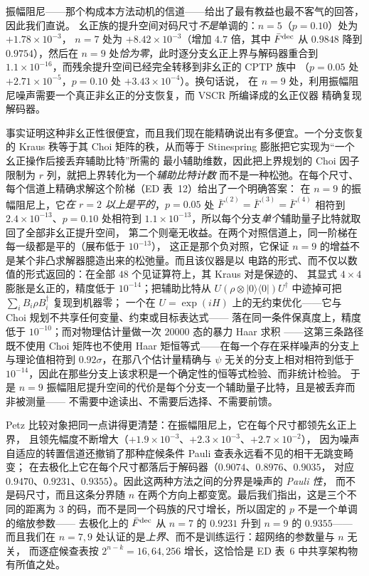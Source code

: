 \documentclass[11pt,a4paper]{article}
\newcommand{\ket}[1]{\lvert #1\rangle}
\newcommand{\bra}[1]{\langle #1\rvert}
\begin{document}
振幅阻尼——那个构成本方法动机的信道——给出了最有教益也最不客气的回答，因此我们直说。
幺正族的提升空间对码尺寸\emph{不是}单调的：$n=5$（$p=0.10$）处为 $+1.78\times10^{-3}$，
$n=7$ 处为 $+8.42\times10^{-3}$（增加 $4.7$ 倍，其中 $\bar F^{\rm dec}$ 从 $0.9848$ 降到
$0.9754$），然后在 $n=9$ 处\emph{恰为零}，此时逐分支幺正上界与解码器重合到
$1.1\times10^{-16}$，而残余提升空间已经完全转移到非幺正的 CPTP 族中
（$p=0.05$ 处 $+2.71\times10^{-5}$，$p=0.10$ 处 $+3.43\times10^{-4}$）。换句话说，
在 $n=9$ 处，利用振幅阻尼噪声需要一个真正非幺正的分支恢复，而 VSCR 所编译成的幺正仪器
精确复现解码器。

事实证明这种非幺正性很便宜，而且我们现在能精确说出有多便宜。一个分支恢复的 Kraus 秩等于其
Choi 矩阵的秩，从而等于 Stinespring 膨胀把它实现为“一个幺正操作后接丢弃辅助比特”所需的
最小辅助维数，因此把上界规划的 Choi 因子限制为 $r$ 列，就把上界转化为一个\emph{辅助比特计数}
而不是一种松弛。在每个尺寸、每个信道上精确求解这个阶梯（ED 表~12）给出了一个明确答案：
在 $n=9$ 的振幅阻尼上，它\emph{在 $r=2$ 以上是平的}，$p=0.05$ 处
$\bar F^{(2)}=\bar F^{(3)}=\bar F^{(4)}$ 相符到 $2.4\times10^{-13}$、$p=0.10$ 处相符到
$1.1\times10^{-13}$，所以每个分支\emph{单个}辅助量子比特就取回了全部非幺正提升空间，
第二个则毫无收益。在两个对照信道上，同一阶梯在每一级都是平的（展布低于 $10^{-13}$），
这正是那个负对照，它保证 $n=9$ 的增益不是某个非凸求解器臆造出来的松弛量。而且该仪器是以
电路的形式、而不仅以数值的形式返回的：在全部 $48$ 个见证算符上，其 Kraus 对是保迹的、
其显式 $4\times4$ 膨胀是幺正的，精度低于 $10^{-14}$；把辅助比特从
$U(\rho\otimes\ket0\bra0)U^\dagger$ 中迹掉可把 $\sum_i B_i\rho B_i^\dagger$ 复现到机器零；
一个在 $U=\exp(iH)$ 上的无约束优化——它与 Choi 规划不共享任何变量、约束或目标表达式——
落在同一条件保真度上，精度低于 $10^{-10}$；而对物理估计量做一次 $20000$ 态的暴力 Haar 求积
——这第三条路径既不使用 Choi 矩阵也不使用 Haar 矩恒等式——在每一个存在采样噪声的分支上
与理论值相符到 $0.92\sigma$，在那八个估计量精确与 $\psi$ 无关的分支上相对相符到低于
$10^{-14}$，因此在那些分支上该求积是一个确定性的恒等式检验、而非统计检验。
于是 $n=9$ 振幅阻尼提升空间的代价是每个分支一个辅助量子比特，且是被丢弃而非被测量——
不需要中途读出、不需要后选择、不需要前馈。

Petz 比较对象把同一点讲得更清楚：在振幅阻尼上，它在每个尺寸都领先幺正上界，
且领先幅度不断增大（$+1.9\times10^{-3}$、$+2.3\times10^{-3}$、$+2.7\times10^{-2}$），
因为噪声自适应的转置信道还撤销了那种症候条件 Pauli 查表永远看不见的相干无跳变畸变；
在去极化上它在每个尺寸都落后于解码器（$0.9074$、$0.8976$、$0.9035$，
对应 $0.9470$、$0.9231$、$0.9355$）。因此这两种方法之间的分界是噪声的 \emph{Pauli 性}，
而不是码尺寸，而且这条分界随 $n$ 在两个方向上都变宽。最后我们指出，这是三个不同的距离为 $3$
的码，而不是同一个码族的尺寸增长，所以固定的 $p$ 不是一个单调的缩放参数——
去极化上的 $\bar F^{\rm dec}$ 从 $n=7$ 的 $0.9231$ 升到 $n=9$ 的 $0.9355$——
而且我们在 $n=7,9$ 处认证的是\emph{上界}、而不是训练运行：超网络的参数量与 $n$ 无关，
而逐症候查表按 $2^{n-k}=16,64,256$ 增长，这恰恰是 ED 表~6 中共享架构物有所值之处。
\end{document}
